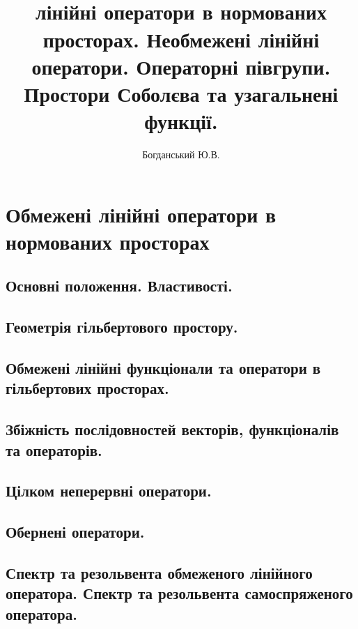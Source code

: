 \documentclass[12pt]{report}
\author{\Huge Богданський Ю.В.}
\title{\textbf{
    \fontsize{40}{48}\selectfont{Задачі з функціонального аналізу}}
    \\
    \vspace{0.5em}
    \fontsize{16}{20}\selectfontОбмежені лінійні оператори в нормованих просторах.
    Необмежені лінійні оператори. Операторні півгрупи.
    Простори Соболєва та узагальнені функції.
    }
\date{}
\begin{document}
    \maketitle
    \tableofcontents
    \chapter{Обмежені лінійні оператори в нормованих просторах}
        \section{Основні положення. Властивості.}
            
            
            
            \newpage
        \section{Геометрія гільбертового простору.}
            
            
            
            
            \newpage
        \section{Обмежені лінійні функціонали та оператори в гільбертових просторах.}
            
            
            
            
            \newpage
        \section{Збіжність послідовностей векторів, функціоналів та операторів.}
            
            
            
            \newpage
        \section{Цілком неперервні оператори.}
            
            
            
            
            \newpage  
        \section{Обернені оператори.}
            
            
            
            \newpage
        \section{Спектр та резольвента обмеженого лінійного оператора. 
                 Спектр та резольвента самоспряженого оператора.}
            
            
            
            \newpage
\end{document}
